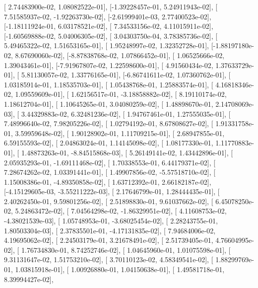 \documentclass{article}
\begin{document}
       [ 2.74483900e-02,  1.08082522e-01],
       [-1.39228457e-01,  5.24911943e-02],
       [ 7.51585937e-02, -1.92263730e-02],
       [-2.61999401e-03,  2.77400523e-02],
       [-1.18111924e-01,  6.03178521e-02],
       [ 7.34533156e-02,  4.11015911e-02],
       [-1.60569888e-02,  5.04006305e-02],
       [ 3.04303750e-04,  3.78385736e-02],
       [ 5.49465322e-02,  1.51653165e-01],
       [ 1.95248997e-02,  1.32352728e-01],
       [-1.88197180e-02,  8.67690060e-02],
       [-8.87838768e-02,  1.07866452e-01],
       [ 1.06525666e-02,  1.39043461e-01],
       [-7.91967807e-02,  1.22598600e-01],
       [ 4.91560434e-02,  1.37633729e-01],
       [ 5.81130057e-02,  1.33776165e-01],
       [-6.86741611e-02,  1.07360762e-01],
       [ 1.03185914e-01,  1.18535703e-01],
       [ 1.05438768e-01,  1.25883574e-01],
       [ 4.16818346e-02,  1.09559609e-01],
       [ 1.62156517e-01, -3.18858882e-02],
       [ 8.19110174e-02,  1.18612704e-01],
       [ 1.10645265e-01,  3.04080259e-02],
       [ 1.48898670e-01,  2.14708069e-03],
       [ 3.44329883e-02,  6.32481236e-02],
       [ 1.94767461e-01,  1.27555035e-01],
       [ 7.48996640e-02,  7.98205226e-02],
       [ 1.02794192e-01,  8.67808627e-02],
       [ 1.91331758e-01,  3.59959648e-02],
       [ 1.90128902e-01,  1.11709215e-01],
       [ 2.68947855e-01,  6.59155593e-02],
       [ 2.04863024e-01,  1.14145098e-02],
       [ 1.08177330e-01,  1.11770883e-01],
       [ 1.48873263e-01, -8.84515868e-03],
       [ 5.26149141e-02,  1.43442896e-01],
       [ 2.05935293e-01, -1.69111468e-02],
       [ 1.70338553e-01,  6.44179371e-02],
       [ 7.28674262e-02,  1.03391441e-01],
       [ 1.49907856e-02, -5.57518710e-02],
       [ 1.15008386e-01, -4.89350858e-02],
       [ 1.63712392e-01,  2.66182187e-02],
       [-4.15129605e-03, -3.55211222e-03],
       [ 2.17646799e-01,  1.28444435e-01],
       [ 2.40262450e-01,  9.59801256e-02],
       [ 2.51898830e-01,  9.61037662e-02],
       [ 6.45078250e-02,  5.24863472e-02],
       [ 7.04564298e-02, -1.86329951e-02],
       [ 4.11608753e-02, -4.38021539e-03],
       [ 1.05748953e-01, -3.68025454e-02],
       [ 2.28243755e-01,  1.80503304e-03],
       [ 2.37835501e-01, -4.17131835e-02],
       [ 7.94684006e-02,  4.19695062e-02],
       [ 2.24503179e-01,  3.21678491e-02],
       [ 2.51739405e-01,  4.76604995e-02],
       [ 1.76734830e-01,  8.74252746e-02],
       [ 1.04645960e-01,  1.01075598e-01],
       [ 9.31131647e-02,  1.51753210e-02],
       [ 3.70110123e-02,  4.58349541e-02],
       [ 1.88299769e-01,  1.03815918e-01],
       [ 1.00926880e-01,  1.04150638e-01],
       [ 1.49581718e-01,  8.39994427e-02],
\end{document}
